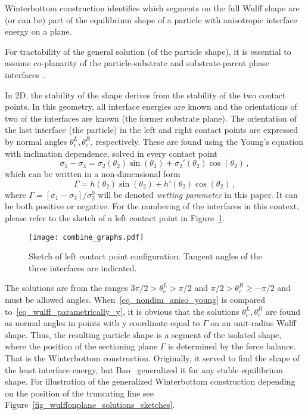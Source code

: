	Winterbottom construction identifies which segments on the full Wulff shape are (or can be) part of the equilibrium shape of a particle with anisotropic interface energy on a plane. 
	
	For tractability of the general solution (of the particle shape), it is essential to assume co-planarity of the particle-substrate and substrate-parent phase interfaces~\cite{Winterbottom1967, Cahn1974, Bao2017}. 
	
	In 2D, the stability of the shape derives from the stability of the two contact points. In this geometry, all interface energies are known and the orientations of two of the interfaces are known (the former substrate plane). The orientation of the last interface (the particle) in the left and right contact points are expressed by normal angles $\theta_c^L,\theta_c^R$, respectively. These are found using the Young's equation with inclination dependence, solved in every contact point 
	\begin{equation}\label{eq_Young_anisotropic}
		\sigma_1 - \sigma_{3} = \sigma_2(\theta_2)\sin(\theta_2) + \sigma_2'(\theta_2)\cos(\theta_2) \,,
	\end{equation}
	which can be written in a non-dimensional form
	\begin{equation} \label{eq_nondim_aniso_young}
		\Gamma = h(\theta_2)\sin(\theta_2) + h'(\theta_2)\cos(\theta_2) \,,
	\end{equation}
	where $\Gamma = [\sigma_{1}-\sigma_3 ]/\sigma_2^0$ will be denoted \textit{wetting parameter} in this paper. It can be both positive or negative. For the numbering of the interfaces in this context, please refer to the sketch of a left contact point in Figure~\ref{fig_sketch_Lcontact_point}.
	
	\begin{figure}
		\centering
		\texttt{[image: combine\_graphs.pdf]}
		\caption[Sketch of left contact point configuration]{Sketch of left contact point configuration. Tangent angles of the three interfaces are indicated.}
		\label{fig_sketch_Lcontact_point}
	\end{figure}
	
	The solutions are from the ranges $3\pi/2>\theta_c^L>\pi/2$ and $\pi/2>\theta_c^R\geq-\pi/2$ and must be allowed angles. When~\eqref{eq_nondim_aniso_young} is compared to~\eqref{eq_wulff_parametrically_y}, it is obvious that the solutions $\theta_c^L,\theta_c^R$ are found as normal angles in points with y coordinate equal to $\Gamma$ on an unit-radius Wulff shape.  Thus, the resulting particle shape is a segment of the isolated shape, where the position of the sectioning plane $\Gamma$ is determined by the force balance. That is the Winterbottom construction. Originally, it served to find the shape of the least interface energy, but Bao~\cite{Bao2017} generalized it for any stable equilibrium shape. For illustration of the generalized Winterbottom construction depending on the position of the truncating line see Figure~\ref{fig_wulffonplane_solutions_sketches}.
	
